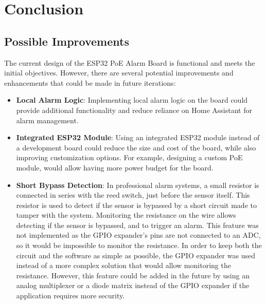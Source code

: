 \documentclass[a4paper,12pt]{article}
\begin{document}
\section{Conclusion}

\subsection{Possible Improvements}
The current design of the ESP32 PoE Alarm Board is functional and meets the initial objectives. However, there are several potential improvements and enhancements that could be made in future iterations:
\begin{itemize}
    \item \textbf{Local Alarm Logic}: Implementing local alarm logic on the board could provide additional functionality and reduce reliance on Home Assistant for alarm management.
    \item \textbf{Integrated ESP32 Module}: Using an integrated ESP32 module instead of a development board could reduce the size and cost of the board, while also improving customization options. For example, designing a custom PoE module, would allow having more power budget for the board.
    \item \textbf{Short Bypass Detection}: In professional alarm systems, a small resistor is connected in series with the reed switch, just before the sensor itself. This resistor is used to detect if the sensor is bypassed by a short circuit made to tamper with the system. Monitoring the resistance on the wire allows detecting if the sensor is bypassed, and to trigger an alarm. This feature was not implemented as the GPIO expander's pins are not connected to an ADC, so it would be impossible to monitor the resistance. In order to keep both the circuit and the software as simple as possible, the GPIO expander was used instead of a more complex solution that would allow monitoring the resistance. However, this feature could be added in the future by using an analog multiplexer or a diode matrix instead of the GPIO expander if the application requires more security.
\end{itemize}
\end{document}
